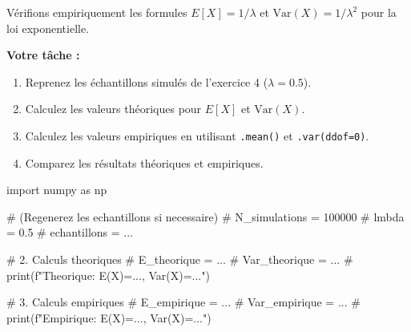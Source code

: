 \begin{exercicebox}
Vérifions empiriquement les formules $E[X] = 1/\lambda$ et $\text{Var}(X) = 1/\lambda^2$ pour la loi exponentielle.

\textbf{Votre tâche :}
\begin{enumerate}
    \item Reprenez les échantillons simulés de l'exercice 4 ($\lambda=0.5$).
    \item Calculez les valeurs théoriques pour $E[X]$ et $\text{Var}(X)$.
    \item Calculez les valeurs empiriques en utilisant \texttt{.mean()} et \texttt{.var(ddof=0)}.
    \item Comparez les résultats théoriques et empiriques.
\end{enumerate}

\begin{codecell}
import numpy as np

# (Regenerez les echantillons si necessaire)
# N_simulations = 100000
# lmbda = 0.5
# echantillons = ...

# 2. Calculs theoriques
# E_theorique = ...
# Var_theorique = ...
# print(f"Theorique: E(X)=..., Var(X)=...")

# 3. Calculs empiriques
# E_empirique = ...
# Var_empirique = ...
# print(f"Empirique: E(X)=..., Var(X)=...")
\end{codecell}
\end{exercicebox}